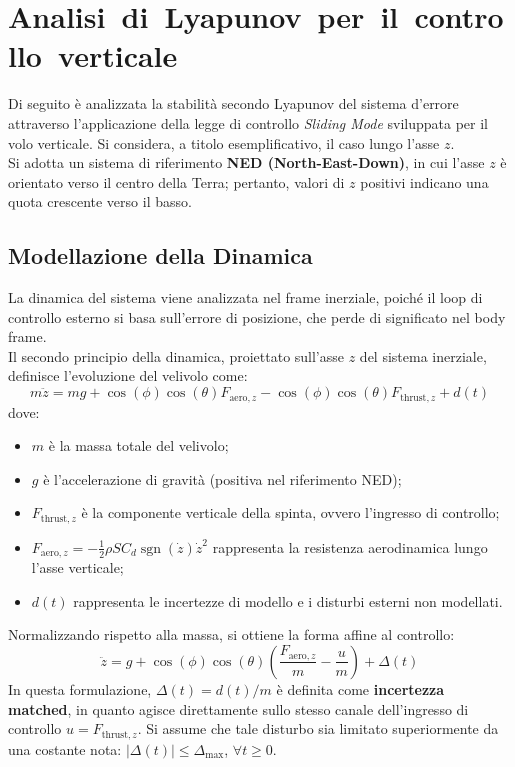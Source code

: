 \section{\hbox{Analisi di Lyapunov per il controllo verticale}}
Di seguito è analizzata la stabilità secondo Lyapunov del sistema d'errore attraverso l'applicazione della legge di controllo \textit{Sliding Mode} sviluppata per il volo verticale. Si considera, a titolo esemplificativo, il caso lungo l'asse $z$.\\
Si adotta un sistema di riferimento \textbf{NED (North-East-Down)}, in cui l'asse $z$ è orientato verso il centro della Terra; pertanto, valori di $z$ positivi indicano una quota crescente verso il basso.

\subsection{Modellazione della Dinamica}
La dinamica del sistema viene analizzata nel frame inerziale, poiché il loop di controllo esterno si basa sull'errore di posizione, che perde di significato nel body frame.\\
Il secondo principio della dinamica, proiettato sull'asse $z$ del sistema inerziale, definisce l'evoluzione del velivolo come:
\begin{equation}
    m\ddot{z} = mg + \cos(\phi)\cos(\theta) F_{\mathrm{aero},z} - \cos(\phi)\cos(\theta) F_{\mathrm{thrust},z} + d(t)
    \label{eq:dynamics_z_final}
\end{equation}
dove:
\begin{itemize}
    \item $m$ è la massa totale del velivolo;
    \item $g$ è l'accelerazione di gravità (positiva nel riferimento NED);
    \item $F_{\mathrm{thrust},z}$ è la componente verticale della spinta, ovvero l'ingresso di controllo;
    \item $F_{\mathrm{aero},z} = -\frac{1}{2}\rho S C_d \operatorname{sgn}(\dot{z})\dot{z}^2$ rappresenta la resistenza aerodinamica lungo l'asse verticale;
    \item $d(t)$ rappresenta le incertezze di modello e i disturbi esterni non modellati.
\end{itemize}
Normalizzando rispetto alla massa, si ottiene la forma affine al controllo:
\begin{equation}
    \ddot{z} = g + \cos(\phi)\cos(\theta) \left(\frac{F_{\mathrm{aero},z}}{m} - \frac{u}{m} \right) + \Delta(t)
\end{equation}
In questa formulazione, $\Delta(t) = d(t)/m$ è definita come \textbf{incertezza matched}, in quanto agisce direttamente sullo stesso canale dell'ingresso di controllo $u = F_{\mathrm{thrust},z}$. Si assume che tale disturbo sia limitato superiormente da una costante nota: \hbox{$|\Delta(t)| \le \Delta_{\max}$}, $\forall t \ge 0$.

